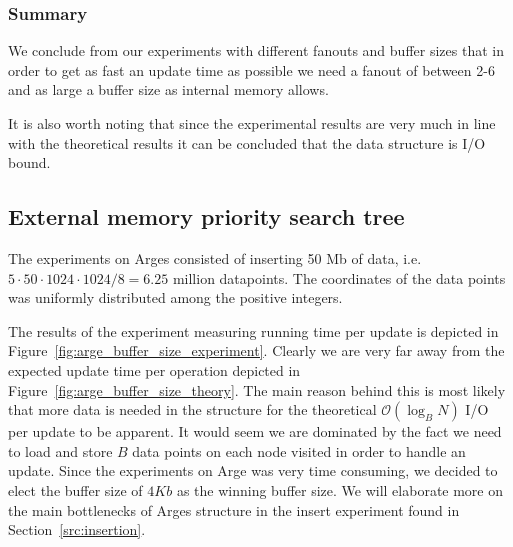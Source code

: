 \documentclass[twoside,11pt,openright]{report}
\begin{document}
\clearpage

\subsubsection*{Summary}

We conclude from our experiments with different fanouts and buffer sizes that in order to get as fast an update time as possible we need a fanout of between 2-6 and as large a buffer size as internal memory allows.

It is also worth noting that since the experimental results are very much in line with the theoretical results it can be concluded that the data structure is I/O bound.

\subsection{External memory priority search tree}
\label{subsec:tuning_arge}

The experiments on Arges consisted of inserting 50 Mb of data, i.e. $5 \cdot 50 \cdot 1024 \cdot 1024 / 8 = 6.25$ million datapoints. The coordinates of the data points was uniformly distributed among the positive integers. 

The results of the experiment measuring running time per update is depicted in Figure~\ref{fig:arge_buffer_size_experiment}. Clearly we are very far away from the expected update time per operation depicted in Figure~\ref{fig:arge_buffer_size_theory}. The main reason behind this is most likely that more data is needed in the structure for the theoretical $\mathcal{O}(\log_B N)$ I/O per update to be apparent. It would seem we are dominated by the fact we need to load and store $B$ data points on each node visited in order to handle an update. Since the experiments on Arge was very time consuming, we decided to elect the buffer size of $4 Kb$ as the winning buffer size. We will elaborate more on the main bottlenecks of Arges structure in the insert experiment found in Section~\ref{src:insertion}.
\end{document}
